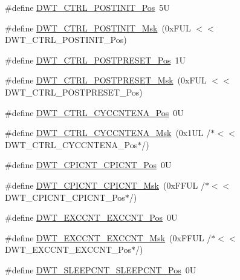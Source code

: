 \begin{DoxyCompactItemize}
\item 
\#define \hyperlink{group___c_m_s_i_s___d_w_t_ga2868c0b28eb13be930afb819f55f6f25}{D\-W\-T\-\_\-\-C\-T\-R\-L\-\_\-\-P\-O\-S\-T\-I\-N\-I\-T\-\_\-\-Pos}~5\-U
\item 
\#define \hyperlink{group___c_m_s_i_s___d_w_t_gab8cbbee1e1d94d09f9a1f86379a08ee8}{D\-W\-T\-\_\-\-C\-T\-R\-L\-\_\-\-P\-O\-S\-T\-I\-N\-I\-T\-\_\-\-Msk}~(0x\-F\-U\-L $<$$<$ D\-W\-T\-\_\-\-C\-T\-R\-L\-\_\-\-P\-O\-S\-T\-I\-N\-I\-T\-\_\-\-Pos)
\item 
\#define \hyperlink{group___c_m_s_i_s___d_w_t_ga129bc152febfddd67a0c20c6814cba69}{D\-W\-T\-\_\-\-C\-T\-R\-L\-\_\-\-P\-O\-S\-T\-P\-R\-E\-S\-E\-T\-\_\-\-Pos}~1\-U
\item 
\#define \hyperlink{group___c_m_s_i_s___d_w_t_ga11d9e1e2a758fdd2657aa68ce61b9c9d}{D\-W\-T\-\_\-\-C\-T\-R\-L\-\_\-\-P\-O\-S\-T\-P\-R\-E\-S\-E\-T\-\_\-\-Msk}~(0x\-F\-U\-L $<$$<$ D\-W\-T\-\_\-\-C\-T\-R\-L\-\_\-\-P\-O\-S\-T\-P\-R\-E\-S\-E\-T\-\_\-\-Pos)
\item 
\#define \hyperlink{group___c_m_s_i_s___d_w_t_gaa4509f5f8514a7200be61691f0e01f10}{D\-W\-T\-\_\-\-C\-T\-R\-L\-\_\-\-C\-Y\-C\-C\-N\-T\-E\-N\-A\-\_\-\-Pos}~0\-U
\item 
\#define \hyperlink{group___c_m_s_i_s___d_w_t_ga4a9d209dc2a81ea6bfa0ea21331769d3}{D\-W\-T\-\_\-\-C\-T\-R\-L\-\_\-\-C\-Y\-C\-C\-N\-T\-E\-N\-A\-\_\-\-Msk}~(0x1\-U\-L /$\ast$$<$$<$ D\-W\-T\-\_\-\-C\-T\-R\-L\-\_\-\-C\-Y\-C\-C\-N\-T\-E\-N\-A\-\_\-\-Pos$\ast$/)
\item 
\#define \hyperlink{group___c_m_s_i_s___d_w_t_ga80e9ad8f6a9e2344af8a3cf989bebe3d}{D\-W\-T\-\_\-\-C\-P\-I\-C\-N\-T\-\_\-\-C\-P\-I\-C\-N\-T\-\_\-\-Pos}~0\-U
\item 
\#define \hyperlink{group___c_m_s_i_s___d_w_t_ga76f39e7bca3fa86a4dbf7b8f6adb7217}{D\-W\-T\-\_\-\-C\-P\-I\-C\-N\-T\-\_\-\-C\-P\-I\-C\-N\-T\-\_\-\-Msk}~(0x\-F\-F\-U\-L /$\ast$$<$$<$ D\-W\-T\-\_\-\-C\-P\-I\-C\-N\-T\-\_\-\-C\-P\-I\-C\-N\-T\-\_\-\-Pos$\ast$/)
\item 
\#define \hyperlink{group___c_m_s_i_s___d_w_t_ga031c693654030d4cba398b45d2925b1d}{D\-W\-T\-\_\-\-E\-X\-C\-C\-N\-T\-\_\-\-E\-X\-C\-C\-N\-T\-\_\-\-Pos}~0\-U
\item 
\#define \hyperlink{group___c_m_s_i_s___d_w_t_ga057fa604a107b58a198bbbadb47e69c9}{D\-W\-T\-\_\-\-E\-X\-C\-C\-N\-T\-\_\-\-E\-X\-C\-C\-N\-T\-\_\-\-Msk}~(0x\-F\-F\-U\-L /$\ast$$<$$<$ D\-W\-T\-\_\-\-E\-X\-C\-C\-N\-T\-\_\-\-E\-X\-C\-C\-N\-T\-\_\-\-Pos$\ast$/)
\item 
\#define \hyperlink{group___c_m_s_i_s___d_w_t_ga0371a84a7996dc5852c56afb2676ba1c}{D\-W\-T\-\_\-\-S\-L\-E\-E\-P\-C\-N\-T\-\_\-\-S\-L\-E\-E\-P\-C\-N\-T\-\_\-\-Pos}~0\-U

\end{DoxyCompactItemize}
